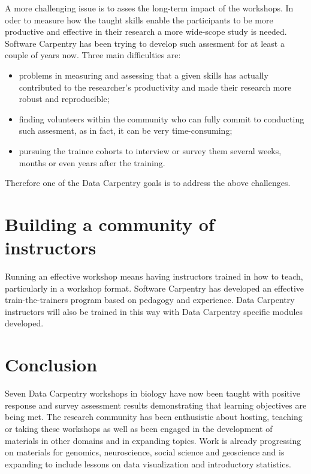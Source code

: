 \documentclass[15]{idcc}
\begin{document}
\begin{itemize}
A more challenging issue is to asses the long-term impact of the workshops. In oder to measure how the taught skills enable the participants to 
be more productive and effective in their research a more wide-scope study is needed. Software Carpentry has been trying to develop such assesment
for at least a couple of years now. Three main difficulties are:
\begin{itemize}
\item problems in measuring and assessing that a given skills has actually contributed to the researcher's productivity and made their research more robust and reproducible;
\item finding volunteers within the community who can fully commit to conducting such assesment, as in fact, it can be very time-consuming;
\item pursuing the trainee cohorts to interview or survey them several weeks, months or even years after the training.
\end{itemize}

Therefore one of the Data Carpentry goals is to address the above challenges. 


\section{Building a community of instructors}
Running an effective workshop means having instructors trained in how to teach, particularly in a workshop format.
 Software Carpentry has developed an effective train-the-trainers program based on pedagogy and experience.
 Data Carpentry instructors will also be trained in this way with Data Carpentry specific modules developed.




\section{Conclusion}


Seven Data Carpentry workshops in biology have now been taught with positive response and survey 
assessment results demonstrating that learning objectives are being met. The research community 
has been enthusistic about hosting, teaching or taking these workshops as well as been engaged in
 the development of materials in other domains and in expanding topics. Work is already progressing on materials 
for genomics, neuroscience, social science and geoscience and is expanding to include lessons on data visualization and introductory statistics.


\end{itemize}
\end{document}
